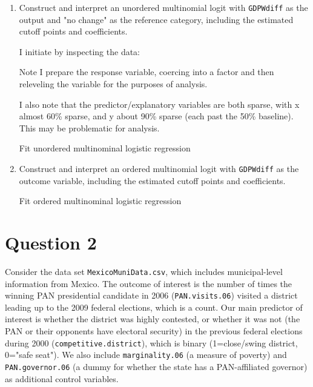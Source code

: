 \documentclass[12pt,letterpaper]{article}
\begin{document}
\begin{enumerate}
	\item Construct and interpret an unordered multinomial logit with \texttt{GDPWdiff} as the output and "no change" as the reference category, including the estimated cutoff points and coefficients.
	
		\noindent I initiate by inspecting the data:
	
	
	
	\noindent Note I prepare the response variable, coercing into a factor and then releveling the variable for the purposes of analysis.
	
	
	
	\noindent I also note that the predictor/explanatory variables are both sparse, with x almost 60\% sparse, and y about 90\% sparse (each past the 50\% baseline). This may be problematic for analysis.
		
	
	
	\noindent Fit unordered multinominal logistic regression

	
	
	\item Construct and interpret an ordered multinomial logit with \texttt{GDPWdiff} as the outcome variable, including the estimated cutoff points and coefficients.

	\noindent Fit ordered multinominal logistic regression

	
	
\end{enumerate}

\section*{Question 2} 
\vspace{.25cm}

\noindent Consider the data set \texttt{MexicoMuniData.csv}, which includes municipal-level information from Mexico. The outcome of interest is the number of times the winning PAN presidential candidate in 2006 (\texttt{PAN.visits.06}) visited a district leading up to the 2009 federal elections, which is a count. Our main predictor of interest is whether the district was highly contested, or whether it was not (the PAN or their opponents have electoral security) in the previous federal elections during 2000 (\texttt{competitive.district}), which is binary (1=close/swing district, 0="safe seat"). We also include \texttt{marginality.06} (a measure of poverty) and \texttt{PAN.governor.06} (a dummy for whether the state has a PAN-affiliated governor) as additional control variables. 
\end{document}
